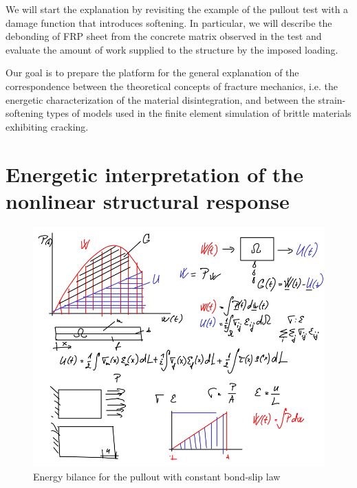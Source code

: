 \documentclass[main.tex]{subfiles}
\begin{document}
We will start the explanation by revisiting the example of the pullout test with a damage function that introduces softening. 
In particular, we will describe the debonding of FRP sheet from the concrete matrix observed in the test and evaluate the amount of work supplied to the structure by the imposed loading.

Our goal is to prepare the platform for the general explanation of the correspondence between the theoretical concepts of fracture mechanics, i.e. the energetic characterization of the material disintegration, and between the strain-softening types of models used in the finite element simulation of brittle materials exhibiting cracking.


\section{Energetic interpretation of the nonlinear structural response}

\begin{figure}[h!]
	\centering
  \includegraphics[width=1.0\textwidth]{drawings/energy_dissipation.png}
	\caption{Energy bilance for the pullout with constant bond-slip law}
	\label{FIGDrawingEnergyPullout}
\end{figure}
\end{document}
